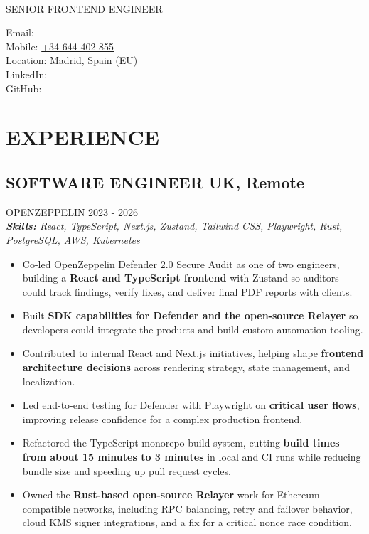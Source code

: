 \documentclass{article}
\newcommand{\WorkExperience}[2]{
   \subsection*{#1}
   \vspace{-1em}
   \uppercase{#2}
}
\newcommand{\Skills}[1]{
   \textit{\textbf{Skills:} #1}
}
\begin{document}
\begin{center}
	\begin{minipage}{0.5\textwidth}
		{\fontsize{24}{28}\Title{}} \\
		\bigskip
		{\normalsize \MakeUppercase{Senior Frontend Engineer}}
	\end{minipage} \hfill
	\begin{minipage}{0.4\textwidth}
		\raggedleft{}
		Email: \href{mailto:\ResumeEmail}{\ResumeEmail} \\
		Mobile: \href{tel:+34644402855}{+34 644 402 855}  \\
		Location: Madrid, Spain (EU) \\
		LinkedIn: \href{\ResumeLinkedInUrl}{\ResumeLinkedInLabel} \\
		GitHub: \href{\ResumeGitHubUrl}{\ResumeGitHubLabel}
	\end{minipage}
\end{center}

\vspace{-3em}

\phantom{Amazon, Microsoft, Facebook} %

\section*{EXPERIENCE}
\WorkExperience{SOFTWARE ENGINEER \hfill UK, Remote}{OpenZeppelin \hfill 2023 {-} 2026} \\
\Skills{React, TypeScript, Next.js, Zustand, Tailwind CSS, Playwright, Rust, PostgreSQL, AWS, Kubernetes}
\begin{itemize}
	\item Co-led OpenZeppelin Defender 2.0 Secure Audit as one of two engineers, building a \textbf{React and TypeScript frontend} with Zustand so auditors could track findings, verify fixes, and deliver final PDF reports with clients.
	\item Built \textbf{SDK capabilities for Defender and the open-source Relayer} so developers could integrate the products and build custom automation tooling.
	\item Contributed to internal React and Next.js initiatives, helping shape \textbf{frontend architecture decisions} across rendering strategy, state management, and localization.
	\item Led end-to-end testing for Defender with Playwright on \textbf{critical user flows}, improving release confidence for a complex production frontend.
	\item Refactored the TypeScript monorepo build system, cutting \textbf{build times from about 15 minutes to 3 minutes} in local and CI runs while reducing bundle size and speeding up pull request cycles.
	\item Owned the \textbf{Rust-based open-source Relayer} work for Ethereum-compatible networks, including RPC balancing, retry and failover behavior, cloud KMS signer integrations, and a fix for a critical nonce race condition.
\end{itemize}
\end{document}
